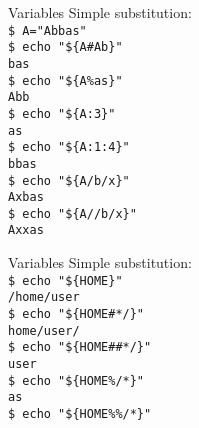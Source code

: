 \documentclass{beamer}
\let\tt\texttt
\begin{document}
\begin{frame}{Variables}
        Simple substitution:                            \\
        \tt{\$ A="Abbas"}                               \\
        \tt{\$ echo "\$\{A\#Ab\}"}                      \\
        \tt{bas}                                        \\
        \tt{\$ echo "\$\{A\%as\}"}                      \\
        \tt{Abb}                                        \\
        \tt{\$ echo "\$\{A:3\}"}                        \\
        \tt{as}                                         \\
        \tt{\$ echo "\$\{A:1:4\}"}                      \\
        \tt{bbas}                                       \\
        \tt{\$ echo "\$\{A/b/x\}"}                      \\
        \tt{Axbas}                                      \\
        \tt{\$ echo "\$\{A//b/x\}"}                     \\
        \tt{Axxas}                                      \\
\end{frame}
\begin{frame}{Variables}
        Simple substitution:                \\
        \tt{\$ echo "\$\{HOME\}"}           \\
        \tt{/home/user}                     \\
        \tt{\$ echo "\$\{HOME\#*/\}"}       \\
        \tt{home/user/}                     \\
        \tt{\$ echo "\$\{HOME\#\#*/\}"}     \\
        \tt{user}                           \\
        \tt{\$ echo "\$\{HOME\%/*\}"}       \\
        \tt{as}                             \\
        \tt{\$ echo "\$\{HOME\%\%/*\}"}     \\
        \tt{}                               \\
\end{frame}
\end{document}
